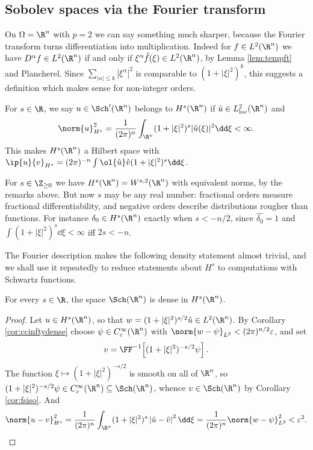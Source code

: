 \subsection{Sobolev spaces via the Fourier transform}

On $\Omega=\R^n$ with $p = 2$ we can say something much sharper, because the Fourier transform turns differentiation into multiplication. Indeed for $f \in L^2(\R^n)$ we have $D^\alpha f \in L^2(\R^n)$ if and only if $\xi^\alpha\hat f(\xi)\in L^2(\R^n)$, by Lemma \ref{lem:tempft} and Plancherel. Since $\sum_{|\alpha|\le k}|\xi^\alpha|^2$ is comparable to $(1+|\xi|^2)^k$, this suggests a definition which makes sense for non-integer orders.

\begin{definition}
	For $s\in\R$, we say $u \in \Sch'(\R^n)$ belongs to $H^s(\R^n)$ if $\hat u \in L^2_{\mathrm{loc}}(\R^n)$ and
	$$\norm{u}_{H^s}^2 = \frac{1}{(2\pi)^n}\int_{\R^n}(1+|\xi|^2)^s|\hat u(\xi)|^2\dd\xi<\infty.$$
	This makes $H^s(\R^n)$ a Hilbert space with $\ip{u}{v}_{H^s}=(2\pi)^{-n}\int\ol{\hat u}\hat v(1+|\xi|^2)^s\dd\xi$.
\end{definition}

For $s \in \Z_{\ge0}$ we have $H^s(\R^n)=W^{s,2}(\R^n)$ with equivalent norms, by the remarks above. But now $s$ may be any real number: fractional orders measure fractional differentiability, and negative orders describe distributions rougher than functions. For instance $\delta_0 \in H^s(\R^n)$ exactly when $s < -n/2$, since $\hat{\delta_0}=1$ and $\int(1+|\xi|^2)^s\dd\xi<\infty$ iff $2s<-n$.

The Fourier description makes the following density statement almost trivial, and we shall use it repeatedly to reduce statements about $H^s$ to computations with Schwartz functions.

\begin{lemma}\label{lem:schwartzdense}
	For every $s \in \R$, the space $\Sch(\R^n)$ is dense in $H^s(\R^n)$.
\end{lemma}

\begin{proof}
	Let $u \in H^s(\R^n)$, so that $w = (1+|\xi|^2)^{s/2}\hat u \in L^2(\R^n)$. By Corollary \ref{cor:ccinftydense} choose $\psi \in C_c^\infty(\R^n)$ with $\norm{w - \psi}_{L^2}<(2\pi)^{n/2}\varepsilon$, and set
	$$v = \FF^{-1}\!\left[ (1+|\xi|^2)^{-s/2}\psi\right].$$
	The function $\xi\mapsto(1+|\xi|^2)^{-s/2}$ is smooth on all of $\R^n$, so $(1+|\xi|^2)^{-s/2}\psi \in C_c^\infty(\R^n)\subseteq\Sch(\R^n)$, whence $v \in \Sch(\R^n)$ by Corollary \ref{cor:fsiso}. And
	$$\norm{u-v}_{H^s}^2=\frac{1}{(2\pi)^n}\int_{\R^n}(1+|\xi|^2)^s\left|\hat u - \hat v\right|^2\dd\xi = \frac{1}{(2\pi)^n}\norm{w-\psi}^2_{L^2}<\varepsilon^2. \qedhere$$
\end{proof}

